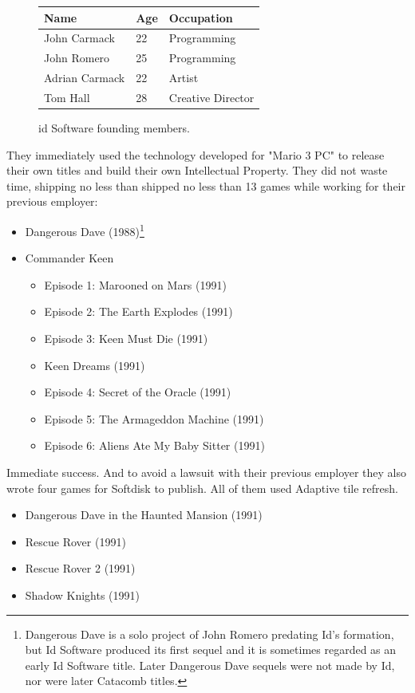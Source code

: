 \documentclass[book.tex]{subfiles}
\begin{document}
 \begin{figure}[H]
\centering  
\begin{tabularx}{\textwidth}{ X  X  X  }
  \toprule
  \textbf{Name} &  \textbf{Age} & \textbf{Occupation} \\
  \toprule 
   John Carmack & 22 &  Programming\\
   John Romero & 25 &  Programming\\
   Adrian Carmack & 22 &  Artist\\
   Tom Hall & 28 &  Creative Director\\
     \toprule
\end{tabularx}
\caption{id Software founding members.}\label{fig:Id Software team}
\end{figure}
They immediately used the technology developed for "Mario 3 PC" to release their own titles and build their own Intellectual Property. They did not waste time, shipping no less than shipped no less than 13 games while working for their previous employer:
\begin{itemize}
  \item Dangerous Dave (1988)\footnote{Dangerous Dave is a solo project of John Romero predating Id's formation, but Id Software produced its first sequel and it is sometimes regarded as an early Id Software title. Later Dangerous Dave sequels were not made by Id, nor were later Catacomb titles.}
  \item Commander Keen
  \begin{itemize}
    \item Episode 1: Marooned on Mars (1991)
    \item Episode 2: The Earth Explodes (1991)
    \item Episode 3: Keen Must Die (1991)
    \item Keen Dreams (1991)
    \item Episode 4: Secret of the Oracle (1991)
    \item Episode 5: The Armageddon Machine (1991)
    \item Episode 6: Aliens Ate My Baby Sitter (1991)
  \end{itemize}
\end{itemize}
Immediate success.
And to avoid a lawsuit with their previous employer they also wrote four games for Softdisk to publish. All of them used Adaptive tile refresh.
\begin{itemize}
  \item Dangerous Dave in the Haunted Mansion (1991)
  \item Rescue Rover (1991)
  \item Rescue Rover 2 (1991)
  \item Shadow Knights (1991)
\end{itemize}
\end{document}
